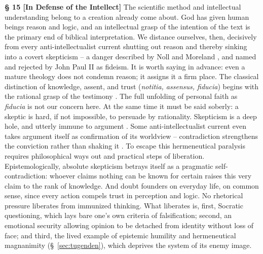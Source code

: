 \documentclass[11pt,a4paper]{article}
\makeatletter
\newcommand{\apthsec}[3]{%
  \phantomsection%
  \def\@currentlabel{#1}%
  \label{sec:#3}%
  \textbf{§ #1 [#2]}%
}
\makeatother
\begin{document}
\apthsec{15}{In Defense of the Intellect}{kategorial} The scientific method and intellectual understanding belong to a creation already come about. God has given human beings reason and logic, and an intellectual grasp of the intention of the text is the primary end of biblical interpretation. We distance ourselves, then, decisively from every anti-intellectualist current shutting out reason and thereby sinking into a covert skepticism -- a danger described by Noll \citeyearpar{noll1994} and Moreland \citeyearpar{moreland1997}, and named and rejected by John Paul II \citeyearpar{fidesetratio1998} as fideism. It is worth saying in advance: even a mature theology does not condemn reason; it assigns it a firm place. The classical distinction of knowledge, assent, and trust (\textit{notitia, assensus, fiducia}) begins with the rational grasp of the testimony \citep{calvin1559}. The full unfolding of personal faith as \textit{fiducia} is not our concern here. At the same time it must be said soberly: a skeptic is hard, if not impossible, to persuade by rationality. Skepticism is a deep hole, and utterly immune to argument \citep{wittgenstein1969}. Some anti-intellectualist current even takes argument itself as confirmation of its worldview -- contradiction strengthens the conviction rather than shaking it \citep{festinger1956,noll1994}. To escape this hermeneutical paralysis requires philosophical ways out and practical steps of liberation. Epistemologically, absolute skepticism betrays itself as a pragmatic self-contradiction: whoever claims nothing can be known for certain raises this very claim to the rank of knowledge. And doubt founders on everyday life, on common sense, since every action compels trust in perception and logic. No rhetorical pressure liberates from immunized thinking. What liberates is, first, Socratic questioning, which lays bare one's own criteria of falsification; second, an emotional security allowing opinion to be detached from identity without loss of face; and third, the lived example of epistemic humility and hermeneutical magnanimity (§~\ref{sec:tugenden}), which deprives the system of its enemy image.
\end{document}
